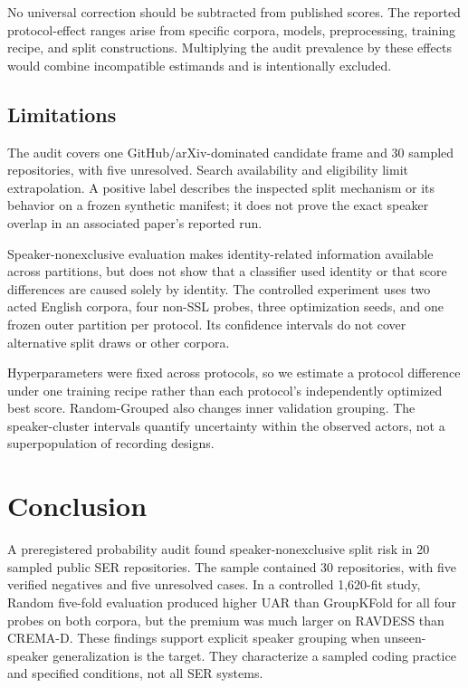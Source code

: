 \documentclass{article}
\begin{document}
No universal correction should be subtracted from published scores.
The reported protocol-effect ranges arise from specific corpora, models, preprocessing, training recipe, and split constructions.
Multiplying the audit prevalence by these effects would combine incompatible estimands and is intentionally excluded.

\subsection{Limitations}

The audit covers one GitHub/arXiv-dominated candidate frame and 30 sampled repositories, with five unresolved.
Search availability and eligibility limit extrapolation.
A positive label describes the inspected split mechanism or its behavior on a frozen synthetic manifest; it does not prove the exact speaker overlap in an associated paper's reported run.

Speaker-nonexclusive evaluation makes identity-related information available across partitions, but does not show that a classifier used identity or that score differences are caused solely by identity.
The controlled experiment uses two acted English corpora, four non-SSL probes, three optimization seeds, and one frozen outer partition per protocol.
Its confidence intervals do not cover alternative split draws or other corpora.

Hyperparameters were fixed across protocols, so we estimate a protocol difference under one training recipe rather than each protocol's independently optimized best score.
Random-Grouped also changes inner validation grouping.
The speaker-cluster intervals quantify uncertainty within the observed actors, not a superpopulation of recording designs.

\section{Conclusion}

A preregistered probability audit found speaker-nonexclusive split risk in 20 sampled public SER repositories.
The sample contained 30 repositories, with five verified negatives and five unresolved cases.
In a controlled 1,620-fit study, Random five-fold evaluation produced higher UAR than GroupKFold for all four probes on both corpora, but the premium was much larger on RAVDESS than CREMA-D.
These findings support explicit speaker grouping when unseen-speaker generalization is the target.
They characterize a sampled coding practice and specified conditions, not all SER systems.
\end{document}
